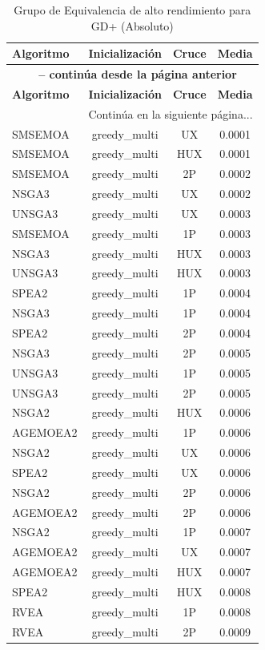 \begin{longtable}{lccc}
    \caption{Grupo de Equivalencia de alto rendimiento para GD+ (Absoluto)}
    \label{tab:elite_gd} \\
    \toprule
    \textbf{Algoritmo} & \textbf{Inicialización} & \textbf{Cruce} & \textbf{Media} \\
    \midrule
    \endfirsthead
    \multicolumn{4}{c}{{\bfseries \tablename\ \thetable{} -- continúa desde la página anterior}} \\
    \toprule
    \textbf{Algoritmo} & \textbf{Inicialización} & \textbf{Cruce} & \textbf{Media} \\
    \midrule
    \endhead
    \midrule \multicolumn{4}{r}{{Continúa en la siguiente página...}} \\
    \endfoot
    \bottomrule
    \endlastfoot
    SMSEMOA & greedy\_multi & UX & 0.0001 \\
SMSEMOA & greedy\_multi & HUX & 0.0001 \\
SMSEMOA & greedy\_multi & 2P & 0.0002 \\
NSGA3 & greedy\_multi & UX & 0.0002 \\
UNSGA3 & greedy\_multi & UX & 0.0003 \\
SMSEMOA & greedy\_multi & 1P & 0.0003 \\
NSGA3 & greedy\_multi & HUX & 0.0003 \\
UNSGA3 & greedy\_multi & HUX & 0.0003 \\
SPEA2 & greedy\_multi & 1P & 0.0004 \\
NSGA3 & greedy\_multi & 1P & 0.0004 \\
SPEA2 & greedy\_multi & 2P & 0.0004 \\
NSGA3 & greedy\_multi & 2P & 0.0005 \\
UNSGA3 & greedy\_multi & 1P & 0.0005 \\
UNSGA3 & greedy\_multi & 2P & 0.0005 \\
NSGA2 & greedy\_multi & HUX & 0.0006 \\
AGEMOEA2 & greedy\_multi & 1P & 0.0006 \\
NSGA2 & greedy\_multi & UX & 0.0006 \\
SPEA2 & greedy\_multi & UX & 0.0006 \\
NSGA2 & greedy\_multi & 2P & 0.0006 \\
AGEMOEA2 & greedy\_multi & 2P & 0.0006 \\
NSGA2 & greedy\_multi & 1P & 0.0007 \\
AGEMOEA2 & greedy\_multi & UX & 0.0007 \\
AGEMOEA2 & greedy\_multi & HUX & 0.0007 \\
SPEA2 & greedy\_multi & HUX & 0.0008 \\
RVEA & greedy\_multi & 1P & 0.0008 \\
RVEA & greedy\_multi & 2P & 0.0009 \\
\end{longtable}

